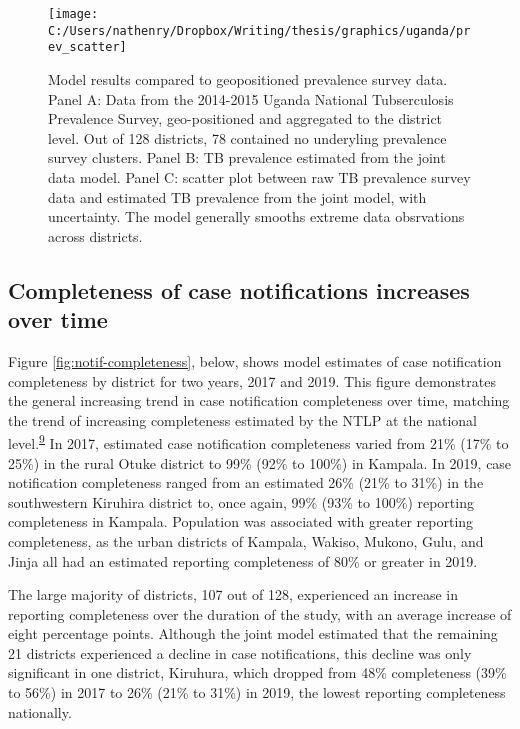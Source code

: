\documentclass[
]{article}
\begin{document}
\begin{figure}[!ht]

{\centering \texttt{[image: C:/Users/nathenry/Dropbox/Writing/thesis/graphics/uganda/prev\_scatter]} 

}

\caption{Model results compared to geopositioned prevalence survey data. Panel A: Data from the 2014-2015 Uganda National Tubserculosis Prevalence Survey, geo-positioned and aggregated to the district level. Out of 128 districts, 78 contained no underyling prevalence survey clusters. Panel B: TB prevalence estimated from the joint data model. Panel C: scatter plot between raw TB prevalence survey data and estimated TB prevalence from the joint model, with uncertainty. The model generally smooths extreme data obsrvations across districts.}\label{fig:prev-scatter}
\end{figure}

\hypertarget{completeness-of-case-notifications-increases-over-time}{%
\subsection{Completeness of case notifications increases over time}\label{completeness-of-case-notifications-increases-over-time}}

Figure \ref{fig:notif-completeness}, below, shows model estimates of case notification completeness by district for two years, 2017 and 2019. This figure demonstrates the general increasing trend in case notification completeness over time, matching the trend of increasing completeness estimated by the NTLP at the national level.\textsuperscript{\protect\hyperlink{ref-UgandaNationalTuberculosisandLeprosyProgramme2020}{9}} In 2017, estimated case notification completeness varied from 21\% (17\% to 25\%) in the rural Otuke district to 99\% (92\% to 100\%) in Kampala. In 2019, case notification completeness ranged from an estimated 26\% (21\% to 31\%) in the southwestern Kiruhira district to, once again, 99\% (93\% to 100\%) reporting completeness in Kampala. Population was associated with greater reporting completeness, as the urban districts of Kampala, Wakiso, Mukono, Gulu, and Jinja all had an estimated reporting completeness of 80\% or greater in 2019.

The large majority of districts, 107 out of 128, experienced an increase in reporting completeness over the duration of the study, with an average increase of eight percentage points. Although the joint model estimated that the remaining 21 districts experienced a decline in case notifications, this decline was only significant in one district, Kiruhura, which dropped from 48\% completeness (39\% to 56\%) in 2017 to 26\% (21\% to 31\%) in 2019, the lowest reporting completeness nationally.
\end{document}
